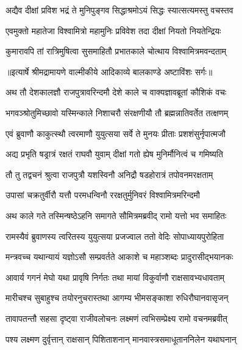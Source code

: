 \twolineshloka
{अद्यैव दीक्षां प्रविश भद्रं ते मुनिपुङ्गव}
{सिद्धाश्रमोऽयं सिद्धः स्यात्सत्यमस्तु वचस्तव} %

\twolineshloka
{एवमुक्तो महातेजा विश्वामित्रो महामुनिः}
{प्रविवेश तदा दीक्षां नियतो नियतेन्द्रियः} %

\twolineshloka
{कुमारावपि तां रात्रिमुषित्वा सुसमाहितौ}
{प्रभातकाले चोत्थाय विश्वामित्रमवन्दताम्} %


{॥इत्यार्षे श्रीमद्रामायणे वाल्मीकीये आदिकाव्ये बालकाण्डे अष्टाविंशः सर्गः॥}


\twolineshloka
{अथ तौ देशकालज्ञौ राजपुत्रावरिन्दमौ}
{देशे काले च वाक्यज्ञावब्रूतां कौशिकं वचः} %

\twolineshloka
{भगवञ्श्रोतुमिच्छावो यस्मिन्काले निशाचरौ}
{संरक्षणीयौ तौ ब्रह्मन्नातिवर्तेत तत्क्षणम्} %

\twolineshloka
{एवं ब्रुवाणौ काकुत्स्थौ त्वरमाणौ युयुत्सया}
{सर्वे ते मुनयः प्रीताः प्रशशंसुर्नृपात्मजौ} %

\twolineshloka
{अद्य प्रभृति षड्रात्रं रक्षतं राघवौ युवाम्}
{दीक्षां गतो ह्येष मुनिर्मौनित्वं च गमिष्यति} %

\twolineshloka
{तौ तु तद्वचनं श्रुत्वा राजपुत्रौ यशस्विनौ}
{अनिद्रौ षडहोरात्रं तपोवनमरक्षताम्} %

\twolineshloka
{उपासां चक्रतुर्वीरौ यत्तौ परमधन्विनौ}
{ररक्षतुर्मुनिवरं विश्वामित्रमरिन्दमौ} %

\twolineshloka
{अथ काले गते तस्मिन्षष्ठेऽहनि समागते}
{सौमित्रमब्रवीद् रामो यत्तो भव समाहितः} %

\twolineshloka
{रामस्यैवं ब्रुवाणस्य त्वरितस्य युयुत्सया}
{प्रजज्वाल ततो वेदिः सोपाध्यायपुरोहिता} %

\twolineshloka
{मन्त्रवच्च यथान्यायं यज्ञोऽसौ सम्प्रवर्तते}
{आकाशे च महाञ्शब्दः प्रादुरासीद्भयानकः} %

\twolineshloka
{आवार्य गगनं मेघो यथा प्रावृषि निर्गतः}
{तथा मायां विकुर्वाणौ राक्षसावभ्यधावताम्} %

\twolineshloka
{मारीचश्च सुबाहुश्च तयोरनुचरास्तथा}
{आगम्य भीमसङ्काशा रुधिरौघानवासृजन्} %

\twolineshloka
{तावापतन्तौ सहसा दृष्ट्वा राजीवलोचनः}
{लक्ष्मणं त्वभिसम्प्रेक्ष्य रामो वचनमब्रवीत्} %

\twolineshloka
{पश्य लक्ष्मण दुर्वृत्तान् राक्षसान् पिशिताशनान्}
{मानवास्त्रसमाधूताननिलेन यथाघनान्} %

